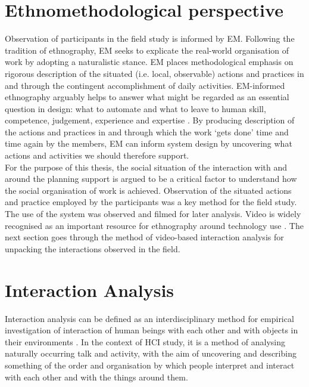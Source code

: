 \section{Ethnomethodological perspective}
Observation of participants in the field study is informed by \acf{EM}. Following the tradition of ethnography, \ac{EM} seeks to explicate the real-world organisation of work by adopting a naturalistic stance. \ac{EM} places methodological emphasis on rigorous description of the situated (i.e. local, observable) actions and practices \cite{Suchman1987} in and through the contingent accomplishment of daily activities. \ac{EM}-informed ethnography arguably helps to answer what might be regarded as an essential question in design: what to automate and what to leave to human skill, competence, judgement, experience and expertise \cite{Crabtree2012}. By producing description of the actions and practices in and through which the work `gets done' time and time again by the members, \ac{EM} can inform system design by uncovering what actions and activities we should therefore support.\\

For the purpose of this thesis, the social situation of the interaction with and around the planning support is argued to be a critical factor to understand how the social organisation of work is achieved. Observation of the situated actions and practice employed by the participants was a key method for the field study. The use of the system was observed and filmed for later analysis. Video is widely recognised as an important resource for ethnography around technology use \cite{Crabtree2012}. The next section goes through the method of video-based interaction analysis for unpacking the interactions observed in the field. \\

\section{Interaction Analysis} \label{sec:aprIA}
Interaction analysis can be defined as an interdisciplinary method for empirical investigation of interaction of human beings with each other and with objects in their environments \cite{Jordan1995}. In the context of \ac{HCI} study, it is a method of analysing naturally occurring talk and activity, with the aim of uncovering and describing something of the order and organisation by which people interpret and interact with each other and with the things around them.\\


